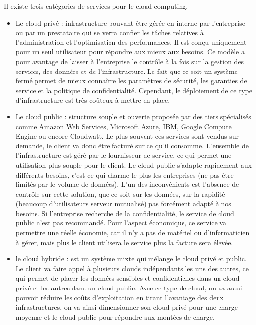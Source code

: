 \documentclass[]{article}
\begin{document}
Il existe trois catégories de services pour le cloud computing.

\begin{itemize}
\item
  Le cloud privé : infrastructure pouvant être gérée en interne par
  l'entreprise ou par un prestataire qui se verra confier les tâches
  relatives à l'administration et l'optimisation des performances. Il
  est conçu uniquement pour un seul utilisateur pour répondre aux mieux
  aux besoins. Ce modèle a pour avantage de laisser à l'entreprise le
  contrôle à la fois sur la gestion des services, des données et de
  l'infrastructure. Le fait que ce soit un système fermé permet de mieux
  connaître les paramètres de sécurité, les garanties de service et la
  politique de confidentialité. Cependant, le déploiement de ce type
  d'infrastructure est très coûteux à mettre en place.
\item
  Le cloud public : structure souple et ouverte proposée par des tiers
  spécialisés comme Amazon Web Services, Microsoft Azure, IBM, Google
  Compute Engine ou encore Cloudwatt. Le plus souvent ces services sont
  vendus sur demande, le client va donc être facturé sur ce qu'il
  consomme. L'ensemble de l'infrastructure est géré par le fournisseur
  de service, ce qui permet une utilisation plus souple pour le client.
  Le cloud public s'adapte rapidement aux différents besoins, c'est ce
  qui charme le plus les entreprises (ne pas être limités par le volume
  de données). L'un des inconvénients est l'absence de contrôle sur
  cette solution, que ce soit sur les données, sur la rapidité (beaucoup
  d'utilisateurs serveur mutualisé) pas forcément adapté à nos besoins.
  Si l'entreprise recherche de la confidentialité, le service de cloud
  public n'est pas recommandé. Pour l'aspect économique, ce service va
  permettre une réelle économie, car il n'y a pas de matériel ou
  d'informaticien à gérer, mais plus le client utilisera le service plus
  la facture sera élevée.
\item
  le cloud hybride : est un système mixte qui mélange le cloud privé et
  public. Le client va faire appel à plusieurs clouds indépendants les
  uns des autres, ce qui permet de placer les données sensibles et
  confidentielles dans un cloud privé et les autres dans un cloud
  public. Avec ce type de cloud, on va aussi pouvoir réduire les coûts
  d'exploitation en tirant l'avantage des deux infrastructures, on va
  ainsi dimensionner son cloud privé pour une charge moyenne et le cloud
  public pour répondre aux montées de charge.
\end{itemize}
\end{document}

